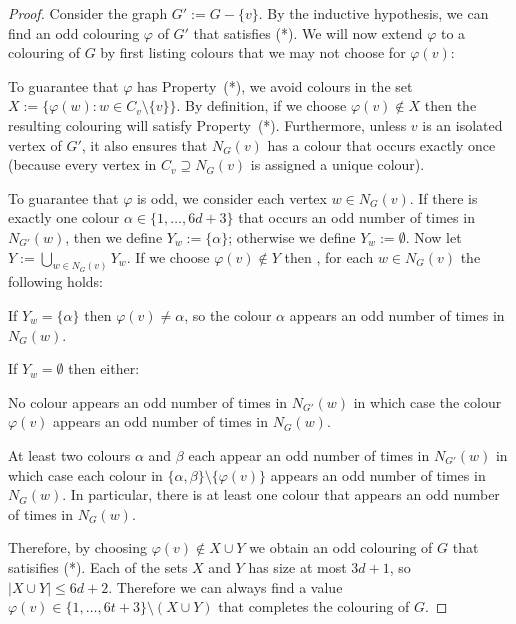 \documentclass{patmorin}
\begin{document}
\begin{proof}
  Consider the graph $G':= G-\{v\}$.  By the inductive hypothesis, we can find an odd colouring $\varphi$ of $G'$ that satisfies (*).  We will now extend $\varphi$ to a colouring of $G$ by first listing colours that we may not choose for $\varphi(v)$:
  \begin{compactitem}
    \item To guarantee that $\varphi$ has Property~(*), we avoid colours in the set $X:= \{\varphi(w): w\in C_v\setminus\{v\}\}$. By definition, if we choose $\varphi(v)\not\in X$ then the resulting colouring will satisfy Property~(*).  Furthermore, unless $v$ is an isolated vertex of $G'$, it also ensures that $N_{G}(v)$ has a colour that occurs exactly once (because every vertex in $C_v\supseteq N_{G}(v)$ is assigned a unique colour).

    \item To guarantee that $\varphi$ is odd, we consider each vertex $w\in N_{G}(v)$.  If there is exactly one colour $\alpha\in\{1,\ldots,6d+3\}$ that occurs an odd number of times in $N_{G'}(w)$, then we define $Y_{w} := \{\alpha\}$; otherwise we define $Y_{w}:=\emptyset$. Now let $Y:=\bigcup_{w\in N_{G}(v)} Y_{w}$.
    If we choose $\varphi(v)\not\in Y$ then , for each $w\in N_{G}(v)$ the following holds:
    \begin{compactitem}
      \item If $Y_{w}=\{\alpha\}$ then $\varphi(v)\neq\alpha$, so the colour $\alpha$ appears an odd number of times in $N_{G}(w)$.
      \item If $Y_{w}=\emptyset$ then either:
      \begin{compactenum}
        \item No colour appears an odd number of times in $N_{G'}(w)$ in which case the colour $\varphi(v)$ appears an odd number of times in $N_{G}(w)$.
        \item At least two colours $\alpha$ and $\beta$ each appear an odd number of times in $N_{G'}(w)$ in which case each colour in $\{\alpha,\beta\}\setminus\{\varphi(v)\}$ appears an odd number of times in $N_{G}(w)$.  In particular, there is at least one colour that appears an odd number of times in $N_G(w)$.
      \end{compactenum}
    \end{compactitem}
  \end{compactitem}
  Therefore, by choosing $\varphi(v)\not\in X\cup Y$ we obtain an odd colouring of $G$ that satisifies (*).  Each of the sets $X$ and $Y$ has size at most $3d+1$, so $|X\cup Y|\le 6d+2$.  Therefore we can always find a value $\varphi(v)\in \{1,\ldots,6t+3\}\setminus(X\cup Y)$ that completes the colouring of $G$.
\end{proof}
\end{document}
